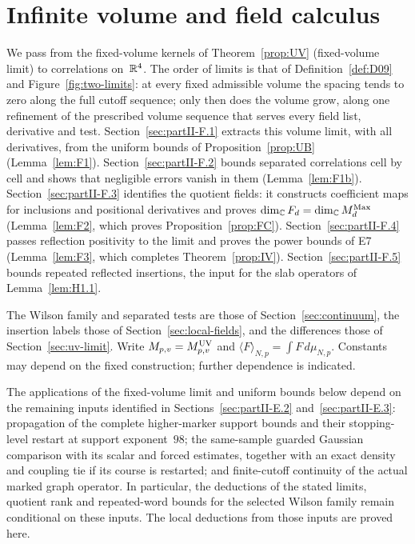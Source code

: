 \section{Infinite volume and field calculus}\label{sec:partII-F}

We pass from the fixed-volume kernels of Theorem~\ref{prop:UV} (fixed-volume limit) to correlations on~$\mathbb{R}^4$. The order of limits is that of Definition~\ref{def:D09} and Figure~\ref{fig:two-limits}: at every fixed admissible volume the spacing tends to zero along the full cutoff sequence; only then does the volume grow, along one refinement of the prescribed volume sequence that serves every field list, derivative and test. Section~\ref{sec:partII-F.1} extracts this volume limit, with all derivatives, from the uniform bounds of Proposition~\ref{prop:UB} (Lemma~\ref{lem:F1}). Section~\ref{sec:partII-F.2} bounds separated correlations cell by cell and shows that negligible errors vanish in them (Lemma~\ref{lem:F1b}). Section~\ref{sec:partII-F.3} identifies the quotient fields: it constructs coefficient maps for inclusions and positional derivatives and proves $\dim_{\mathbb{C}} F_d=\dim_{\mathbb{C}}M_{d}^{\mathrm{Max}}$ (Lemma~\ref{lem:F2}, which proves Proposition~\ref{prop:FC}). Section~\ref{sec:partII-F.4} passes reflection positivity to the limit and proves the power bounds of E7 (Lemma~\ref{lem:F3}, which completes Theorem~\ref{prop:IV}). Section~\ref{sec:partII-F.5} bounds repeated reflected insertions, the input for the slab operators of Lemma~\ref{lem:H1.1}.

The Wilson family and separated tests are those of Section~\ref{sec:continuum}, the insertion labels those of Section~\ref{sec:local-fields}, and the differences those of Section~\ref{sec:uv-limit}. Write $M_{p,v}=M^{\rm UV}_{p,v}$ and $\langle F\rangle_{N,p}=\int F\,d\mu_{N,p}$. Constants may depend on the fixed construction; further dependence is indicated.

The applications of the fixed-volume limit and uniform bounds below depend on the remaining inputs identified in Sections~\ref{sec:partII-E.2} and~\ref{sec:partII-E.3}: propagation of the complete higher-marker support bounds and their stopping-level restart at support exponent~$98$; the same-sample guarded Gaussian comparison with its scalar and forced estimates, together with an exact density and coupling tie if its course is restarted; and finite-cutoff continuity of the actual marked graph operator. In particular, the deductions of the stated limits, quotient rank and repeated-word bounds for the selected Wilson family remain conditional on these inputs. The local deductions from those inputs are proved here.

